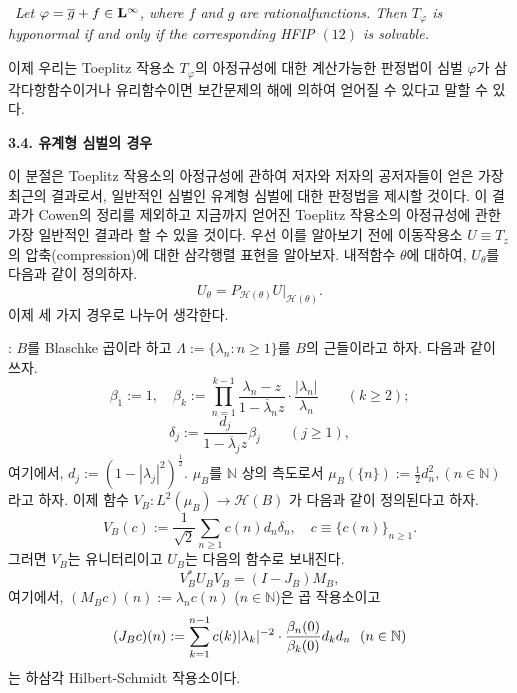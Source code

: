 \documentclass[12pt,a4paper,2sided]{article}
\begin{document}
\ {\sl Let $\varphi=\overline{g}+f\in
\bold L^\infty$, where $f$ and $g$ are rational\linebreak functions.
Then $T_\varphi$ is hyponormal if and only if the corresponding HFIP
$(12)$ is solvable.}


\vspace{0.2cm} 이제 우리는 Toeplitz 작용소 $T_\varphi$의 아정규성에
대한 계산가능한 판정법이 심벌 $\varphi$가 삼각다항함수이거나
유리함수이면 보간문제의 해에 의하여 얻어질 수 있다고 말할 수 있다.

\newpage{}

\vspace{0.8cm}

{\bf 3.4. 유계형 심벌의 경우}

\vspace{0.3cm}

이 분절은 Toeplitz 작용소의 아정규성에 관하여 저자와 저자의
공저자들이 얻은 가장 최근의 결과로서, 일반적인 심벌인 유계형 심벌에
대한 판정법을 제시할 것이다. 이 결과가 Cowen의 정리를 제외하고
지금까지 얻어진 Toeplitz 작용소의 아정규성에 관한 가장 일반적인
결과라 할 수 있을 것이다. 우선 이를 알아보기 전에 이동작용소 $U
\equiv T_z$의 압축(compression)에 대한 삼각행렬 표현을 알아보자.
내적함수 $\theta$에 대하여, $U_\theta$를 다음과 같이 정의하자.
\begin{equation}\label{3.1}
U_\theta= P_{\mathcal H (\theta)} U \vert_{\mathcal H (\theta)}.
\end{equation}
이제 세 가지 경우로 나누어 생각한다.

\vspace{0.3cm}

 : $B$를 Blaschke 곱이라 하고
$\Lambda:=\{\lambda_n : n \geq 1\}$를 $B$의 근들이라고 하자. 다음과
같이 쓰자.
$$
\beta_1:=1, \quad
\beta_k:=\prod_{n=1}^{k-1}\frac{\lambda_n-z}{1-\overline{\lambda}_n z}\cdot
\frac{|\lambda_n|}{\lambda_n}\qquad (k\geq 2);
$$
$$
\delta_j\label{deltaj}:=\frac{d_j}{1-\overline{\lambda}_j z}\beta_j \qquad (j \geq
1),
$$
여기에서, $d_j\label{dj}:=(1-|\lambda_j|^2)^{\frac{1}{2}}$.
$\mu_B\label{mub}$를 $\mathbb N$ 상의 측도로서
$\mu_B(\{n\}):=\frac{1}{2}d_n^2, (n \in \mathbb N)$라고 하자. 이제
함수  $V_B\label{VB}: L^2(\mu_B)\to \mathcal H(B)$ 가 다음과 같이
정의된다고 하자.
\begin{equation}\label{3.2}
V_B(c):=\frac{1}{\sqrt{2}} \sum_{n \geq 1} c(n)d_n \delta_n, \quad c
\equiv \{c(n)\}_{n \geq 1}.
\end{equation}
그러면 $V_B$는 유니터리이고 $U_B$는 다음의 함수로 보내진다.
\begin{equation}\label{3.3}
V_B^*U_B V_B=(I-J_B)M_B,
\end{equation}
여기에서, $(M_B\label{MB} c)(n):=\lambda_n c(n)$ ($n\in \mathbb
N$)은 곱 작용소이고
$$
(J_B\label{JB} c)(n):=\sum_{k=1}^{n-1}c(k)|\lambda_k|^{-2} \cdot
\frac{\beta_n(0)}{\beta_k(0)}d_k d_n \ \ \hbox{$(n \in \mathbb N$)}
$$
는 하삼각 Hilbert-Schmidt 작용소이다. \
\end{document}
